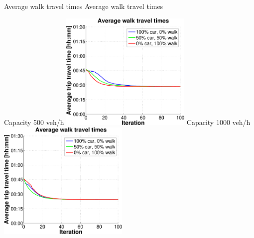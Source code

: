 {}

\createfigure%
{Average walk travel times}%
{Average walk travel times}%
{\label{fig:InitialModeAverageWalkTravelTime}}%
{%
  \createsubfigure%
  {Capacity 500 veh/h}%
  {\includegraphics[width=0.47\textwidth, angle=0, trim=0mm 0mm 0mm 9mm, clip=true]{extending/figures/MultiModalSimulation/simulations/avg_walk_traveltime_500}}%
  {\label{}}%
  {\hspace{3mm}}%
  \createsubfigure%
  {Capacity 1000 veh/h}%
  {\includegraphics[width=0.47\textwidth, angle=0, trim=0mm 0mm 0mm 9mm, clip=true]{extending/figures/MultiModalSimulation/simulations/avg_walk_traveltime_1000}}%
  {\label{}}%
  {\vspace{7.5mm}}%

}
